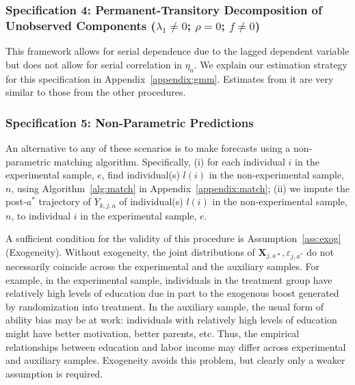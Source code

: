 \subsubsection{Specification 4: Permanent-Transitory Decomposition of Unobserved Components ($\lambda_{1} \neq 0$; $\rho = 0$; $f \neq 0$)} \label{app:permtrans}

This framework allows for serial dependence due to the lagged dependent variable but does not allow for serial correlation in $\eta_{a}$. We explain our estimation strategy for this specification in Appendix~\ref{appendix:gmm}. Estimates from it are very similar to those from the other procedures.

\subsubsection{Specification 5: Non-Parametric Predictions}

An alternative to any of these scenarios is to make forecasts using a non-parametric matching algorithm. Specifically, (i) for each individual $i$ in the experimental sample, $e$, find individual(s) $l(i)$ in the non-experimental sample, $n$, using Algorithm~\ref{alg:match} in Appendix~\ref{appendix:match}; (ii) we impute the post-$a^*$ trajectory of $Y_{k,j,a}$ of individual(s) $l(i)$ in the non-experimental sample, $n$, to individual $i$ in the experimental sample, $e$.

A sufficient condition for the validity of this procedure is Assumption~\ref{ass:exog} (Exogeneity). Without exogeneity, the joint distributions of $\bm{X}_{j,a*}, \varepsilon_{j,a^*}$ do not necessarily coincide across the experimental and the auxiliary samples. For example, in the experimental sample, individuals in the treatment group have relatively high levels of education due in part to the exogenous boost generated by randomization into treatment. In the auxiliary sample, the usual form of ability bias may be at work: individuals with relatively high levels of education might have better motivation, better parents, etc. Thus, the empirical relationships between education and labor income may differ across experimental and auxiliary samples. Exogeneity avoids this problem, but clearly only a weaker assumption is required.

